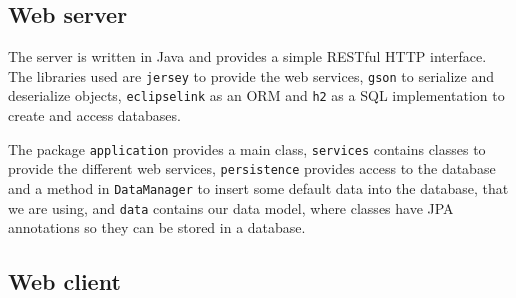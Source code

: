 \documentclass{tk3-team}
\begin{document}
\subsection{Web server}

The server is written in Java and provides a simple RESTful HTTP interface. The libraries used are \texttt{jersey} to provide the web services, \texttt{gson} to serialize and deserialize objects, \texttt{eclipselink} as an ORM and \texttt{h2} as a SQL implementation to create and access databases.

The package \texttt{application} provides a main class, \texttt{services} contains classes to provide the different web services, \texttt{persistence} provides access to the database and a method in \texttt{DataManager} to insert some default data into the database, that we are using, and \texttt{data} contains our data model, where classes have JPA annotations so they can be stored in a database.


\subsection{Web client}
\end{document}
